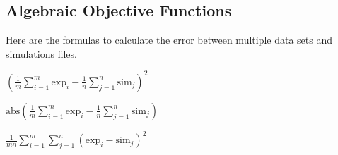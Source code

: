 \documentclass[letterpaper,10pt,english]{sphinxmanual}
\begin{document}
\subsection{Algebraic Objective Functions}
\label{\detokenize{functions/algebraics:algebraic-objective-functions}}\label{\detokenize{functions/algebraics::doc}}
Here are the formulas to calculate the error between multiple data sets and
simulations files.
\begin{itemize}\setlength{\itemsep}{0pt}\setlength{\parskip}{0pt}
\item {} 
\begin{DUlineblock}{0em}
\item[] 
\item[] 
\item[]
\begin{DUlineblock}{\DUlineblockindent}
\item[] \(\left( \frac{1}{m} \sum_{i=1}^{m} \mathrm{exp}_i - \frac{1}{n} \sum_{j=1}^{n} \mathrm{sim}_j \right) ^{2}\)
\end{DUlineblock}
\end{DUlineblock}

\item {} 
\begin{DUlineblock}{0em}
\item[] 
\item[] 
\item[]
\begin{DUlineblock}{\DUlineblockindent}
\item[] \(\mathrm{abs} \left( \frac{1}{m} \sum_{i=1}^{m} \mathrm{exp}_i - \frac{1}{n} \sum_{j=1}^{n} \mathrm{sim}_j \right)\)
\end{DUlineblock}
\end{DUlineblock}

\item {} 
\begin{DUlineblock}{0em}
\item[] 
\item[] 
\item[]
\begin{DUlineblock}{\DUlineblockindent}
\item[] \(\frac{1}{mn} \sum_{i=1}^{m} \sum_{j=1}^{n} \left({\mathrm{exp}_i - \mathrm{sim}_j } \right)^{2}\)
\end{DUlineblock}
\end{DUlineblock}


\end{itemize}
\end{document}
